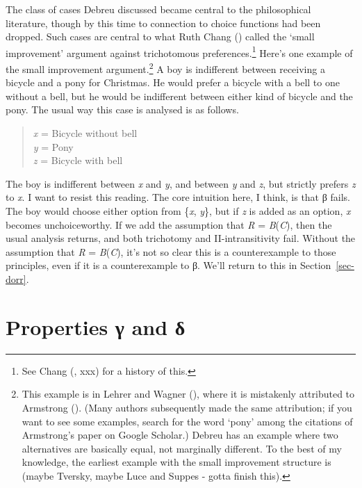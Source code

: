 \documentclass[
  11pt,
  letterpaper,
  DIV=11,
  numbers=noendperiod,
  twoside]{scrartcl}
\begin{document}
The class of cases Debreu discussed became central to the philosophical
literature, though by this time to connection to choice functions had
been dropped. Such cases are central to what Ruth Chang
() called the `small improvement' argument
against trichotomous preferences.\footnote{See Chang
  (, xxx) for a history of this.} Here's
one example of the small improvement argument.\footnote{This example is
  in Lehrer and Wagner (), where it
  is mistakenly attributed to Armstrong
  (). (Many authors subsequently made
  the same attribution; if you want to see some examples, search for the
  word `pony' among the citations of Armstrong's paper on Google
  Scholar.) Debreu has an example where two alternatives are basically
  equal, not marginally different. To the best of my knowledge, the
  earliest example with the small improvement structure is (maybe
  Tversky, maybe Luce and Suppes - gotta finish this).} A boy is
indifferent between receiving a bicycle and a pony for Christmas. He
would prefer a bicycle with a bell to one without a bell, but he would
be indifferent between either kind of bicycle and the pony. The usual
way this case is analysed is as follows.

\begin{quote}
\emph{x} = Bicycle without bell\\
\emph{y} = Pony\\
\emph{z} = Bicycle with bell
\end{quote}

The boy is indifferent between \emph{x} and \emph{y}, and between
\emph{y} and \emph{z}, but strictly prefers \emph{z} to \emph{x}. I want
to resist this reading. The core intuition here, I think, is that β
fails. The boy would choose either option from \{\emph{x}, \emph{y}\},
but if \emph{z} is added as an option, \emph{x} becomes unchoiceworthy.
If we add the assumption that \emph{R} = \emph{B}(\emph{C}), then the
usual analysis returns, and both trichotomy and II-intransitivity fail.
Without the assumption that \emph{R} = \emph{B}(\emph{C}), it's not so
clear this is a counterexample to those principles, even if it is a
counterexample to β. We'll return to this in Section~\ref{sec-dorr}.

\section{Properties γ and δ}\label{sec-gamma}
\end{document}
